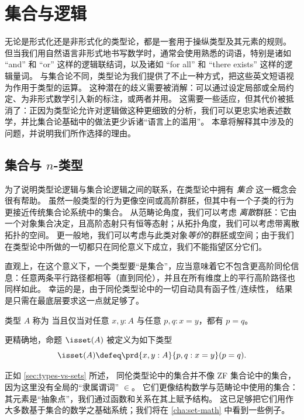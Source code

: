 \chapter{集合与逻辑}
\label{cha:logic}

无论是形式化还是非形式化的类型论，都是一套用于操纵类型及其元素的规则。
但当我们用自然语言非形式地书写数学时，通常会使用熟悉的词语，特别是诸如 ``and'' 和 ``or'' 这样的逻辑联结词，以及诸如 ``for all'' 和 ``there exists'' 这样的逻辑量词。
与集合论不同，类型论为我们提供了不止一种方式，把这些英文短语视为作用于类型的运算。
这种潜在的歧义需要被消解：可以通过设定局部或全局约定、为非形式数学引入新的标注，或两者并用。
这需要一些适应，但其代价被抵消了：正因为类型论允许对逻辑做这种更细致的分析，我们可以更忠实地表述数学，并比集合论基础中的做法更少诉诸“语言上的滥用”。
本章将解释其中涉及的问题，并说明我们所作选择的理由。
\section{集合与 \texorpdfstring{$n$}{n}-类型}
\label{sec:basics-sets}

%

为了说明类型论逻辑与集合论逻辑之间的联系，在类型论中拥有 \emph{集合} 这一概念会很有帮助。
虽然一般类型的行为更像空间或高阶群胚，但其中有一个子类的行为更接近传统集合论系统中的集合。
从范畴论角度，我们可以考虑 \emph{离散}群胚：它由一个对象集合决定，且高阶态射只有恒等态射；从拓扑角度，我们可以考虑带离散拓扑的空间。
更一般地，我们可以考虑与此类对象\emph{等价}的群胚或空间；由于我们在类型论中所做的一切都只在同伦意义下成立，我们不能指望区分它们。

直观上，在这个意义下，一个类型要“是集合”，应当意味着它不包含更高阶同伦信息：任意两条平行路径都相等（直到同伦），并且在所有维度上的平行高阶路径也同样如此。
幸运的是，由于同伦类型论中的一切自动具有函子性/连续性，
%
%
结果是只需在最底层要求这一点就足够了。

\begin{defn}\label{defn:set}
  类型 $A$ 称为 
  当且仅当对任意 $x,y:A$ 与任意 $p,q:x=y$，都有 $p=q$。
\end{defn}

更精确地，命题 $\isset(A)$ 被定义为如下类型
\[ \isset(A) \defeq \prd{x,y:A}{p,q:x=y} (p=q). \]

正如 \cref{sec:types-vs-sets} 所述，
同伦类型论中的集合并不像 ZF 集合论中的集合，因为这里没有全局的“隶属谓词” $\in$。
它们更像结构数学与范畴论中使用的集合：其元素是“抽象点”，我们通过函数和关系在其上赋予结构。
这已足够把它们用作大多数基于集合的数学之基础系统；我们将在 \cref{cha:set-math} 中看到一些例子。

